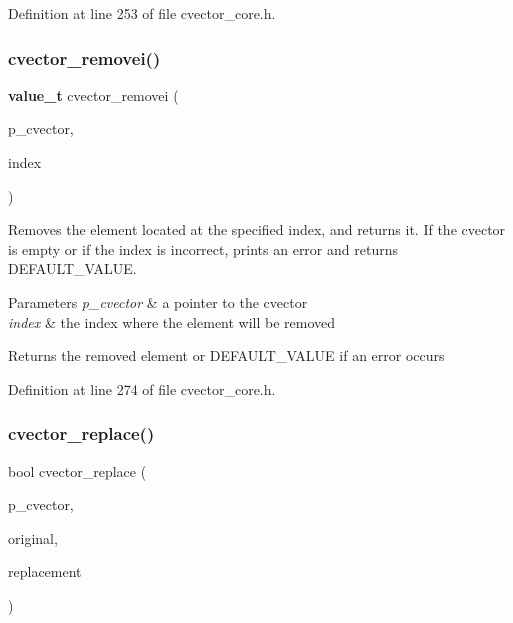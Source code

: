 Definition at line 253 of file cvector\+\_\+core.\+h.

\mbox{\label{cvector__interface_8h_aa10fda3704501241f975de8789dc5d9c}} 
\subsubsection{cvector\+\_\+removei()}
{\footnotesize\ttfamily \textbf{ value\+\_\+t} cvector\+\_\+removei (\begin{DoxyParamCaption}\item[{\textbf{ cvector} $\ast$}]{p\+\_\+cvector,  }\item[{\textbf{ index\+\_\+t}}]{index }\end{DoxyParamCaption})}

Removes the element located at the specified index, and returns it. If the cvector is empty or if the index is incorrect, prints an error and returns D\+E\+F\+A\+U\+L\+T\+\_\+\+V\+A\+L\+UE. 
\begin{DoxyParams}{Parameters}
{\em p\+\_\+cvector} & a pointer to the cvector \\
\hline
{\em index} & the index where the element will be removed \\
\hline
\end{DoxyParams}
\begin{DoxyReturn}{Returns}
the removed element or D\+E\+F\+A\+U\+L\+T\+\_\+\+V\+A\+L\+UE if an error occurs 
\end{DoxyReturn}


Definition at line 274 of file cvector\+\_\+core.\+h.

\mbox{\label{cvector__interface_8h_a3d72487e7685f7ab93fda40cabb60958}} 
\subsubsection{cvector\+\_\+replace()}
{\footnotesize\ttfamily bool cvector\+\_\+replace (\begin{DoxyParamCaption}\item[{\textbf{ cvector} $\ast$}]{p\+\_\+cvector,  }\item[{\textbf{ value\+\_\+t}}]{original,  }\item[{\textbf{ value\+\_\+t}}]{replacement }\end{DoxyParamCaption})}

